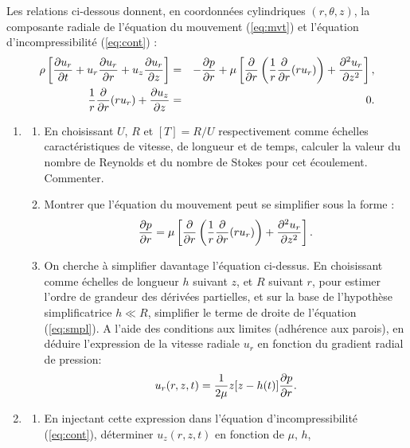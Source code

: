 Les relations ci-dessous donnent, en coordonn\'ees cylindriques
$(r, \theta, z)$, la composante radiale de l'\'equation du mouvement
(\ref{eq:mvt}) et l'\'equation d'incompressibilit\'e (\ref{eq:cont}) : 
\begin{eqnarray}
\rho \left [  \frac {\partial u_r} {\partial t} + u_r \frac {\partial u_r} {\partial r} + u_z \frac {\partial u_r} {\partial z} \right ]
&=& - \frac {\partial p} {\partial r} + \mu \left[ 
\frac {\partial } {\partial r} \left( \frac{1}{r}\frac {\partial } {\partial r}(r u_r) \right) + \frac {\partial^{2} u_r} {\partial z ^{2}} \right],
\label{eq:mvt} \\
\frac{1}{r} \frac {\partial } {\partial r}(r u_r) + \frac {\partial u_z} {\partial z} & = & 0.
\label{eq:cont}
\end{eqnarray} 

\begin{enumerate}
\item
  \begin{enumerate}
  \item 
    En choisissant $U$, $R$  et $[T] = R/U$ respectivement comme \'echelles caract\'eristiques
    de vitesse, de longueur et de temps, calculer la valeur du nombre de Reynolds et du nombre de Stokes pour cet \'ecoulement. Commenter.
  \item 
    Montrer que l'\'equation du mouvement peut se simplifier sous la forme :
    \begin{equation}
      \frac {\partial p} {\partial r} = \mu \left[ \frac {\partial } {\partial r} \left( \frac{1}{r}\frac {\partial } {\partial r}(r u_r) \right) +
	\frac {\partial^{2} u_r} {\partial z ^{2}} \right].
      \label{eq:smpl}
    \end{equation}
  \item 
    On cherche \`a simplifier davantage l'\'equation ci-dessus.
    En choisissant comme \'echelles de longueur $h$ suivant $z$, et $R$
    suivant $r$, pour estimer l'ordre de grandeur des d\'eriv\'ees partielles, 
    et sur la base de l'hypoth\`ese simplificatrice $h \ll R$, simplifier le terme de droite 
    de l'\'equation (\ref{eq:smpl}). A l'aide des conditions aux limites (adh\'erence aux parois), 
    en d\'eduire l'expression de la vitesse radiale $u_r$ en fonction du gradient radial 
    de pression:      
  \begin{equation}
    u_r(r, z, t) = \frac{1}{2\mu} z [z-h(t)] \frac {\partial p} {\partial r}.
  \end{equation}
      \end{enumerate}
\item 
  \begin{enumerate}
  \item 
    En injectant cette expression dans l'\'equation d'incompressibilit\'e
    (\ref{eq:cont}), d\'eterminer $u_z(r, z, t)$ en fonction de $\mu$, $h$,

\end{enumerate}
\end{enumerate}
